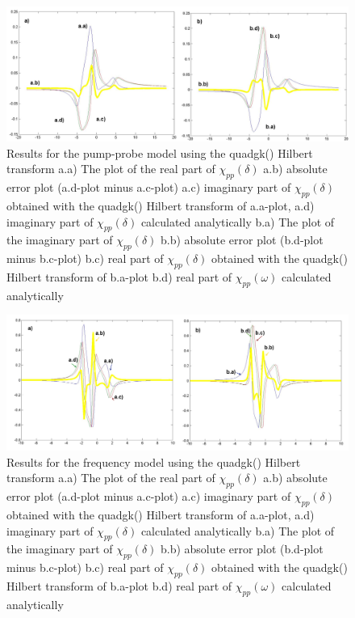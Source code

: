 \documentclass[12pt,twoside,a4paper]{article}
\numberwithin{equation}{subsection}
\numberwithin{figure}{subsection}
\begin{document}
\begin{figure} 
  \includegraphics[width=150mm]{img/quadgk_pnp.png}
  \caption{Results for the pump-probe model using the quadgk() Hilbert transform
     a.a) The plot of the real part of ${\chi_{pp}}(\delta )$
     a.b) absolute error plot (a.d-plot minus a.c-plot)
     a.c) imaginary part of ${\chi_{pp}}(\delta )$ obtained with the quadgk() Hilbert transform of a.a-plot, 
     a.d) imaginary part of ${\chi_{pp}}(\delta )$ calculated analytically 
     b.a) The plot of the imaginary part of ${\chi_{pp}}(\delta )$ 
     b.b) absolute error plot (b.d-plot minus b.c-plot)
     b.c) real part of ${\chi_{pp}}(\delta )$ obtained with the quadgk() Hilbert transform of b.a-plot 
     b.d) real part of $\chi_{pp} (\omega )$ calculated analytically 
     \label{fig:quadgk_pnp}
     }
\end{figure}

\begin{figure} 
  \includegraphics[width=150mm]{img/quadgk_fmix.png}
  \caption{Results for the frequency model using the quadgk() Hilbert transform
     a.a) The plot of the real part of ${\chi_{pp}}(\delta )$
     a.b) absolute error plot (a.d-plot minus a.c-plot)
     a.c) imaginary part of ${\chi_{pp}}(\delta )$ obtained with the quadgk() Hilbert transform of a.a-plot, 
     a.d) imaginary part of ${\chi_{pp}}(\delta )$ calculated analytically 
     b.a) The plot of the imaginary part of ${\chi_{pp}}(\delta )$ 
     b.b) absolute error plot (b.d-plot minus b.c-plot)
     b.c) real part of ${\chi_{pp}}(\delta )$ obtained with the quadgk() Hilbert transform of b.a-plot 
     b.d) real part of $\chi_{pp} (\omega )$ calculated analytically 
     \label{fig:quadgk_fmix}
     }
\end{figure} 
\end{document}
